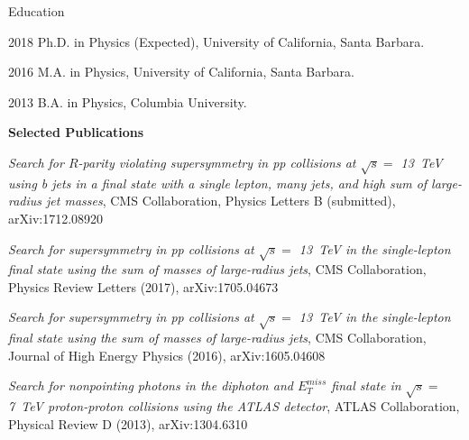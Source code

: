 \begin{vitae}

\begin{vitaesection}{Education}
\vspace{-0.1cm}
\item [2018]	Ph.D. in Physics (Expected), University of California, Santa Barbara.
\item [2016]	M.A. in Physics, University of California, Santa Barbara.
\item [2013]	B.A. in Physics, Columbia University.
\end{vitaesection}

\textbf{Selected Publications}

\textit{Search for $R$-parity violating supersymmetry in pp collisions at $\sqrt{s} =$ 13~TeV using b jets in a final state with a single lepton, many jets, and high sum of large-radius jet masses}, CMS Collaboration, Physics Letters B (submitted), arXiv:1712.08920

\bigskip

\textit{Search for supersymmetry in pp collisions at $\sqrt{s} =$ 13~TeV in the single-lepton final state using the sum of masses of large-radius jets}, CMS Collaboration, Physics Review Letters (2017), arXiv:1705.04673

\bigskip

\textit{Search for supersymmetry in pp collisions at $\sqrt{s} =$ 13~TeV in the single-lepton final state using the sum of masses of large-radius jets}, CMS Collaboration, Journal of High Energy Physics (2016), arXiv:1605.04608

\bigskip

\textit{Search for nonpointing photons in the diphoton and $E_T^{miss}$ final state in $\sqrt{s} =$ 7~TeV proton-proton collisions using the ATLAS detector}, ATLAS Collaboration, Physical Review D (2013), arXiv:1304.6310

\end{vitae}
